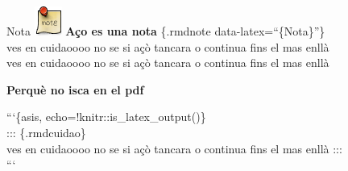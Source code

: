\documentclass[
  10pt,
]{krantz}
\begin{document}
\begin{rmdnote}{Nota}
\includegraphics{imatges/note.png} \textbf{Aço es una nota} \{.rmdnote data-latex=``\{Nota\}''\}\\
ves en cuidaoooo no se si açò tancara o continua fins el mas enllà\\
ves en cuidaoooo no se si açò tancara o continua fins el mas enllà

\end{rmdnote}

\begin{rmdinfo}{}
\textbf{Perquè no isca en el pdf}

```\{asis, echo=!knitr::is\_latex\_output()\}\\
::: \{.rmdcuidao\}\\
ves en cuidaoooo no se si açò tancara o continua fins el mas enllà :::\\
```

\end{rmdinfo}

  
\end{document}
